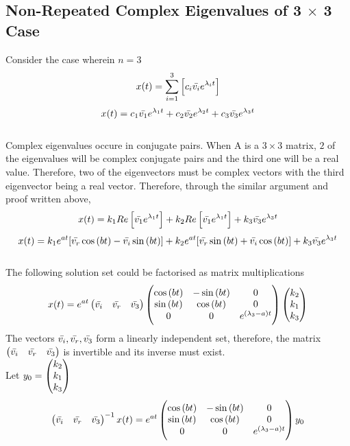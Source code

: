 \documentclass[class=report, 12pt, crop=false]{standalone}
\begin{document}
\begin{center}
\section{Non-Repeated Complex Eigenvalues of 3 $\times$ 3 Case}
\begin{comment}
\end{comment}
Consider the case wherein $n = 3$
$$x(t) = \sum_{i=1}^{3}\left[c_i\bar{v_i}e^{\lambda_i t}\right]$$
$$x(t) = c_1\bar{v_1}e^{\lambda_1 t} + c_2\bar{v_2}e^{\lambda_2 t} + c_3\bar{v_3}e^{\lambda_3 t}$$
\\Complex eigenvalues occure in conjugate pairs. When A is a $3 \times 3$ matrix, $2$ of the eigenvalues will be complex conjugate pairs and the third one will be a real value. Therefore, two of the eigenvectors must be complex vectors with the third eigenvector being a real vector. Therefore, through the similar argument and proof written above, 
$$x(t) = k_1Re\left[\bar{v_1}e^{\lambda_1 t}\right] + k_2Re\left[\bar{v_1}e^{\lambda_1 t}\right] + k_3\bar{v_3}e^{\lambda_3 t}$$
$$x(t)=k_1e^{at}[\bar{v_r}\cos{(bt)} - \bar{v_i}\sin{(bt)}] + k_2e^{at}[\bar{v_r}\sin{(bt)} + \bar{v_i}\cos{(bt)}] + k_3\bar{v_3}e^{\lambda_3 t}$$
\\The following solution set could be factorised as matrix multiplications
$$x(t) = e^{at} \begin{pmatrix} \bar{v_i}&\bar{v_r} &\bar{v_3} \end{pmatrix} \begin{pmatrix}\cos{(bt)} &-\sin{(bt)} &0\\\sin{(bt)}&\cos{(bt)} & 0\\0& 0& e^{(\lambda_3 - a)t}\end{pmatrix} \begin{pmatrix} k_2 \\k_1 \\ k_3 \end{pmatrix}$$
The vectors $\bar{v_i},\bar{v_r},\bar{v_3}$ form a linearly independent set, therefore, the matrix $\displaystyle{\begin{pmatrix} \bar{v_i}&\bar{v_r} &\bar{v_3} \end{pmatrix}}$ is invertible and its inverse must exist.
\\Let $\displaystyle{y_0 = \begin{pmatrix} k_2\\k_1 \\k_3 \end{pmatrix}}$ 
$$\begin{pmatrix} \bar{v_i}&\bar{v_r} &\bar{v_3} \end{pmatrix} ^{-1 }x(t) = e^{at} \begin{pmatrix}\cos{(bt)} &-\sin{(bt)} &0\\\sin{(bt)}&\cos{(bt)} & 0\\0& 0& e^{(\lambda_3 - a)t}\end{pmatrix} y_0$$

\end{center}
\end{document}
